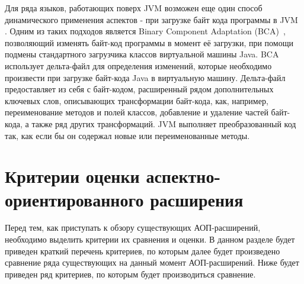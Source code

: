 Для ряда языков, работающих поверх JVM возможен еще один способ динамического
применения аспектов - при загрузке байт кода программы в JVM~
\cite{aspect_dynamic_weavers_in_oop}.
Одним из таких подходов является Binary Component Adaptation (BCA)~\cite{bca},
позволяющий изменять байт-код программы в момент её загрузки, при помощи
подмены стандартного загрузчика классов виртуальной машины Java.
BCA использует дельта-файл для определения изменений, которые необходимо
произвести при загрузке байт-кода Java в виртуальную машину.
Дельта-файл предоставляет из себя с байт-кодом, расширенный рядом дополнительных
ключевых слов, описывающих трансформации байт-кода, как, например,
переименование методов и полей классов, добавление и удаление частей байт-кода,
а также ряд других трансформаций.
JVM выполняет преобразованный код так, как если бы он содержал новые или
переименованные методы.
\section{Критерии оценки аспектно-ориентированного расширения}
\label{sec:aop_extension_criteria}
Перед тем, как приступать к обзору существующих АОП-расширений, необходимо
выделить критерии их сравнения и оценки.
В данном разделе будет приведен краткий перечень критериев, по которым далее
будет произведено сравнение ряда существующих на данный момент АОП-расширений.
Ниже будет приведен ряд критериев, по которым будет производиться сравнение.

